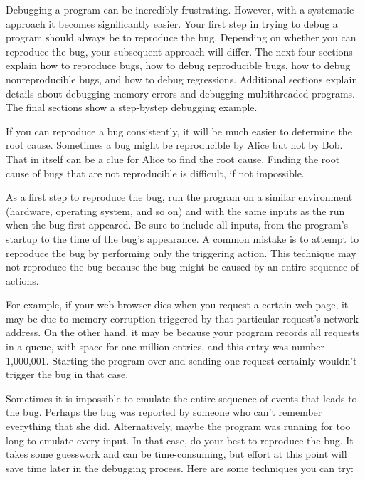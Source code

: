 
Debugging a program can be incredibly frustrating. However, with a systematic approach it becomes significantly easier. Your first step in trying to debug a program should always be to reproduce the bug. Depending on whether you can reproduce the bug, your subsequent approach will differ. The next four sections explain how to reproduce bugs, how to debug reproducible bugs, how to debug nonreproducible bugs, and how to debug regressions. Additional sections explain details about debugging memory errors and debugging multithreaded programs. The final sections show a step-bystep debugging example.


If you can reproduce a bug consistently, it will be much easier to determine the root cause. Sometimes a bug might be reproducible by Alice but not by Bob. That in itself can be a clue for Alice to find the root cause. Finding the root cause of bugs that are not reproducible is difficult, if not impossible.

As a first step to reproduce the bug, run the program on a similar environment (hardware, operating system, and so on) and with the same inputs as the run when the bug first appeared. Be sure to include all inputs, from the program’s startup to the time of the bug’s appearance. A common mistake is to attempt to reproduce the bug by performing only the triggering action. This technique may not reproduce the bug because the bug might be caused by an entire sequence of actions.

For example, if your web browser dies when you request a certain web page, it may be due to memory corruption triggered by that particular request’s network address. On the other hand, it may be because your program records all requests in a queue, with space for one million entries, and this entry was number 1,000,001. Starting the program over and sending one request certainly wouldn’t trigger the bug in that case.

Sometimes it is impossible to emulate the entire sequence of events that leads to the bug. Perhaps the bug was reported by someone who can’t remember everything that she did. Alternatively, maybe the program was running for too long to emulate every input. In that case, do your best to reproduce the bug. It takes some guesswork and can be time-consuming, but effort at this point will save time later in the debugging process. Here are some techniques you can try:

